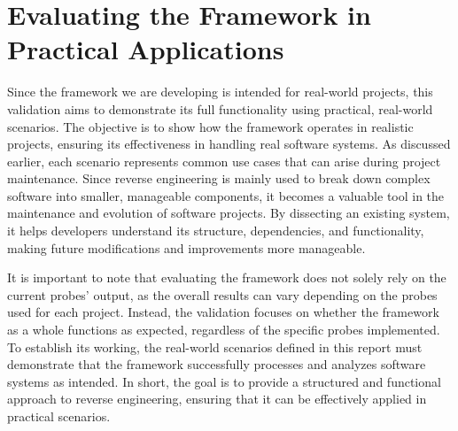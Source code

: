 \section{Evaluating the Framework in Practical Applications}

Since the framework we are developing is intended for real-world projects, this validation aims to demonstrate its full functionality using practical, real-world scenarios. The objective is to show how the framework operates in realistic projects, ensuring its effectiveness in handling real software systems. As discussed earlier, each scenario represents common use cases that can arise during project maintenance. Since reverse engineering is mainly used to break down complex software into smaller, manageable components, it becomes a valuable tool in the maintenance and evolution of software projects. By dissecting an existing system, it helps developers understand its structure, dependencies, and functionality, making future modifications and improvements more manageable.

It is important to note that evaluating the framework does not solely rely on the current probes' output, as the overall results can vary depending on the probes used for each project. Instead, the validation focuses on whether the framework as a whole functions as expected, regardless of the specific probes implemented. To establish its working, the real-world scenarios defined in this report must demonstrate that the framework successfully processes and analyzes software systems as intended. In short, the goal is to provide a structured and functional approach to reverse engineering, ensuring that it can be effectively applied in practical scenarios.





